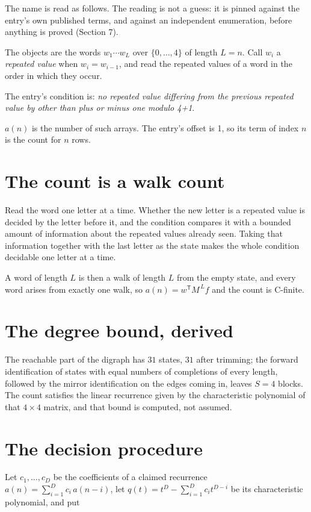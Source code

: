 \documentclass[11pt]{article}
\theoremstyle{definition}
\begin{document}
The name is read as follows. The reading is not a guess: it is pinned against the entry's own published terms, and against an independent enumeration, before anything is proved (Section 7).

The objects are the words $w_1\cdots w_L$ over $\{0,\dots,4\}$ of length $L = n$. Call $w_i$ a {\itshape repeated value} when $w_i = w_{i-1}$, and read the repeated values of a word in the order in which they occur.

The entry's condition is: {\itshape no repeated value differing from the previous repeated value by other than plus or minus one modulo 4+1}.

$a(n)$ is the number of such arrays. The entry's offset is 1, so its term of index $n$ is the count for $n$ rows.

\section{The count is a walk count}

Read the word one letter at a time. Whether the new letter is a repeated value is decided by the letter before it, and the condition compares it with a bounded amount of information about the repeated values already seen. Taking that information together with the last letter as the state makes the whole condition decidable one letter at a time.

A word of length $L$ is then a walk of length $L$ from the empty state, and every word arises from exactly one walk, so $a(n) = w^{\mathsf T}M^{\,L}f$ and the count is C-finite.

\section{The degree bound, derived}

The reachable part of the digraph has $31$ states, $31$ after trimming; the forward identification of states with equal numbers of completions of every length, followed by the mirror identification on the edges coming in, leaves $S = 4$ blocks. The count satisfies the linear recurrence given by the characteristic polynomial of that $4\times4$ matrix, and that bound is computed, not assumed.

\section{The decision procedure}

Let $c_1,\dots,c_D$ be the coefficients of a claimed recurrence $a(n) = \sum_{i=1}^{D} c_i\,a(n-i)$, let $q(t) = t^{D} - \sum_{i=1}^{D} c_i t^{D-i}$ be its characteristic polynomial, and put
\end{document}
